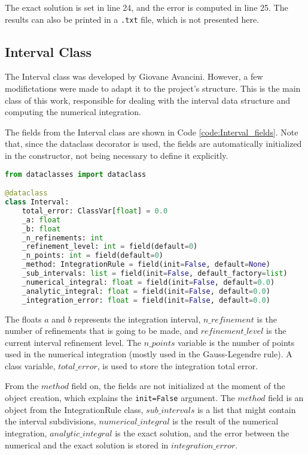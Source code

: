 The exact solution is set in line 24, and the error is computed in line 25. The results can also be printed in a \texttt{.txt} file, which is not presented here.

\subsection{Interval Class}
The Interval class was developed by Giovane Avancini. However, a few modifictations were made to adapt it to the project's structure. This is the main class of this work, responsible for dealing with the interval data structure and computing the numerical integration.

The fields from the Interval class are shown in Code \ref{code:Interval_fields}. Note that, since the dataclass decorator is used, the fields are automatically initialized in the constructor, not being necessary to define it explicitly.
\begin{lstlisting}[language=python, caption={Interval class fields.}, label={code:Interval_fields}]
from dataclasses import dataclass

@dataclass
class Interval:
    total_error: ClassVar[float] = 0.0
    _a: float
    _b: float
    _n_refinements: int
    _refinement_level: int = field(default=0)
    _n_points: int = field(default=0)
    _method: IntegrationRule = field(init=False, default=None)
    _sub_intervals: list = field(init=False, default_factory=list)
    _numerical_integral: float = field(init=False, default=0.0)
    _analytic_integral: float = field(init=False, default=0.0)
    _integration_error: float = field(init=False, default=0.0)
\end{lstlisting}

The floats $a$ and $b$ represents the integration interval, $n\_refinement$ is the number of refinements that is going to be made, and ${refinement\_level}$ is the current interval refinement level. The $n\_points$ variable is the number of points used in the numerical integration (mostly used in the Gauss-Legendre rule). A class variable, $total\_error$, is used to store the integration total error.

From the $method$ field on, the fields are not initialized at the moment of the object creation, which explains the \texttt{init=False} argument. The $method$ field is an object from the IntegrationRule class, $sub\_intervals$ is a list that might contain the interval subdivisions, $numerical\_integral$ is the result of the numerical integration, $analytic\_integral$ is the exact solution, and the error between the numerical and the exact solution is stored in $integration\_error$.

